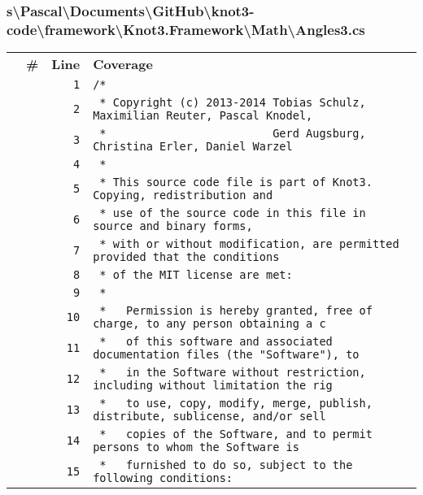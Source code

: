 \documentclass[a4paper,10pt]{article}
\begin{document}
\subsubsection{s\textbackslash Pascal\textbackslash Documents\textbackslash GitHub\textbackslash knot3-code\textbackslash framework\textbackslash Knot3.Framework\textbackslash Math\textbackslash Angles3.cs}
\begin{longtable}[l]{lrrl}
\textbf{} & \textbf{\#} & \textbf{Line} & \textbf{Coverage}\\
\cellcolor{gray} &  & \verb~1~ & \verb~/*~\\
\cellcolor{gray} &  & \verb~2~ & \verb~ * Copyright (c) 2013-2014 Tobias Schulz, Maximilian Reuter, Pascal Knodel,~\\
\cellcolor{gray} &  & \verb~3~ & \verb~ *                         Gerd Augsburg, Christina Erler, Daniel Warzel~\\
\cellcolor{gray} &  & \verb~4~ & \verb~ *~\\
\cellcolor{gray} &  & \verb~5~ & \verb~ * This source code file is part of Knot3. Copying, redistribution and~\\
\cellcolor{gray} &  & \verb~6~ & \verb~ * use of the source code in this file in source and binary forms,~\\
\cellcolor{gray} &  & \verb~7~ & \verb~ * with or without modification, are permitted provided that the conditions~\\
\cellcolor{gray} &  & \verb~8~ & \verb~ * of the MIT license are met:~\\
\cellcolor{gray} &  & \verb~9~ & \verb~ *~\\
\cellcolor{gray} &  & \verb~10~ & \verb~ *   Permission is hereby granted, free of charge, to any person obtaining a c~\\
\cellcolor{gray} &  & \verb~11~ & \verb~ *   of this software and associated documentation files (the "Software"), to ~\\
\cellcolor{gray} &  & \verb~12~ & \verb~ *   in the Software without restriction, including without limitation the rig~\\
\cellcolor{gray} &  & \verb~13~ & \verb~ *   to use, copy, modify, merge, publish, distribute, sublicense, and/or sell~\\
\cellcolor{gray} &  & \verb~14~ & \verb~ *   copies of the Software, and to permit persons to whom the Software is~\\
\cellcolor{gray} &  & \verb~15~ & \verb~ *   furnished to do so, subject to the following conditions:~\\

\end{longtable}
\end{document}
